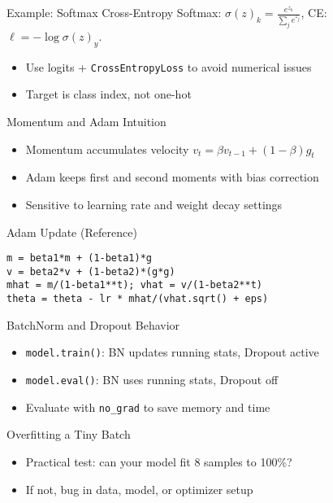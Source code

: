 \documentclass[aspectratio=169,10pt]{beamer}
\begin{document}
\begin{frame}{Example: Softmax Cross-Entropy}
Softmax: $\sigma(z)_k = \frac{e^{z_k}}{\sum_j e^{z_j}}$, CE: $\ell = -\log \sigma(z)_{y}$.
\begin{itemize}
    \item Use logits + \texttt{CrossEntropyLoss} to avoid numerical issues
    \item Target is class index, not one-hot
\end{itemize}
\end{frame}

\begin{frame}{Momentum and Adam Intuition}
\begin{itemize}
    \item Momentum accumulates velocity $v_t = \beta v_{t-1} + (1-\beta) g_t$
    \item Adam keeps first and second moments with bias correction
    \item Sensitive to learning rate and weight decay settings
\end{itemize}
\end{frame}

\begin{frame}[fragile]{Adam Update (Reference)}
\begin{lstlisting}
m = beta1*m + (1-beta1)*g
v = beta2*v + (1-beta2)*(g*g)
mhat = m/(1-beta1**t); vhat = v/(1-beta2**t)
theta = theta - lr * mhat/(vhat.sqrt() + eps)
\end{lstlisting}
\end{frame}

\begin{frame}{BatchNorm and Dropout Behavior}
\begin{itemize}
    \item \texttt{model.train()}: BN updates running stats, Dropout active
    \item \texttt{model.eval()}: BN uses running stats, Dropout off
    \item Evaluate with \texttt{no\_grad} to save memory and time
\end{itemize}
\end{frame}

\begin{frame}{Overfitting a Tiny Batch}
\begin{itemize}
    \item Practical test: can your model fit 8 samples to 100\%?
    \item If not, bug in data, model, or optimizer setup
\end{itemize}
\end{frame}
\end{document}
